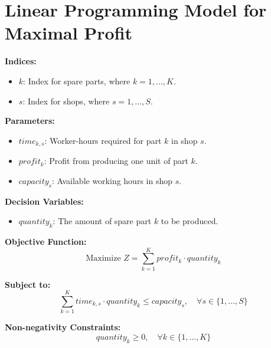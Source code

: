\documentclass{article}
\begin{document}
\section*{Linear Programming Model for Maximal Profit}

\textbf{Indices:}
\begin{itemize}
    \item $k$: Index for spare parts, where $k = 1, \ldots, K$.
    \item $s$: Index for shops, where $s = 1, \ldots, S$.
\end{itemize}

\textbf{Parameters:}
\begin{itemize}
    \item $time_{k,s}$: Worker-hours required for part $k$ in shop $s$.
    \item $profit_{k}$: Profit from producing one unit of part $k$.
    \item $capacity_{s}$: Available working hours in shop $s$.
\end{itemize}

\textbf{Decision Variables:}
\begin{itemize}
    \item $quantity_{k}$: The amount of spare part $k$ to be produced.
\end{itemize}

\textbf{Objective Function:}
\begin{equation}
\text{Maximize } Z = \sum_{k=1}^{K} profit_{k} \cdot quantity_{k}
\end{equation}

\textbf{Subject to:}
\begin{equation}
\sum_{k=1}^{K} time_{k,s} \cdot quantity_{k} \leq capacity_{s}, \quad \forall s \in \{1, \ldots, S\}
\end{equation}

\textbf{Non-negativity Constraints:}
\begin{equation}
quantity_{k} \geq 0, \quad \forall k \in \{1, \ldots, K\}
\end{equation}
\end{document}
